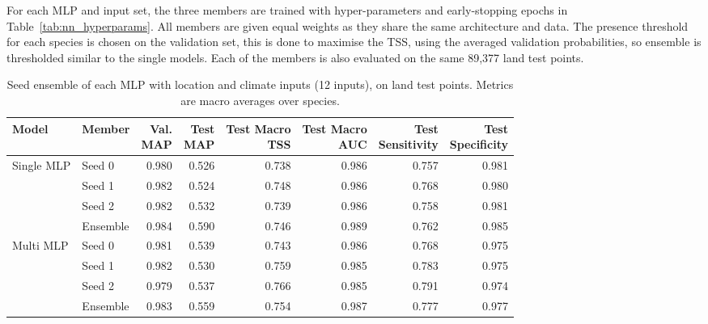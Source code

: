 \documentclass{article}
\begin{document}
For each MLP and input set, the three members are trained with hyper-parameters and early-stopping epochs in Table~\ref{tab:nn_hyperparams}. All members are given equal weights as they share the same architecture and data. The presence threshold for each species is chosen on the validation set, this is done to maximise the TSS, using the averaged validation probabilities, so ensemble is thresholded similar to the single models. Each of the members is also evaluated on the same 89,377 land test points.

\begin{table}[ht]
    \centering
    \small
    \renewcommand{\arraystretch}{0.92}
    \setlength{\aboverulesep}{2pt}
    \setlength{\belowrulesep}{2pt}
    \setlength{\tabcolsep}{2pt}
    \newcommand{\hdr}[1]{\begin{tabular}[b]{@{}r@{}}#1\end{tabular}}
    \begin{tabular*}{\linewidth}{@{\extracolsep{\fill}} llrrrrrr @{}}
        \toprule
        Model & Member & \hdr{Val. \\ MAP} & \hdr{Test \\ MAP} & \hdr{Test Macro \\ TSS} & \hdr{Test Macro \\ AUC} & \hdr{Test \\ Sensitivity} & \hdr{Test \\ Specificity} \\
        \midrule
        \multirow{4}{*}{Single MLP}
            & Seed 0   & 0.980 & 0.526 & 0.738 & 0.986 & 0.757 & 0.981 \\
            & Seed 1   & 0.982 & 0.524 & 0.748 & 0.986 & 0.768 & 0.980 \\
            & Seed 2   & 0.982 & 0.532 & 0.739 & 0.986 & 0.758 & 0.981 \\
            & Ensemble & 0.984 & 0.590 & 0.746 & 0.989 & 0.762 & 0.985 \\
        \midrule
        \multirow{4}{*}{Multi MLP}
            & Seed 0   & 0.981 & 0.539 & 0.743 & 0.986 & 0.768 & 0.975 \\
            & Seed 1   & 0.982 & 0.530 & 0.759 & 0.985 & 0.783 & 0.975 \\
            & Seed 2   & 0.979 & 0.537 & 0.766 & 0.985 & 0.791 & 0.974 \\
            & Ensemble & 0.983 & 0.559 & 0.754 & 0.987 & 0.777 & 0.977 \\
        \bottomrule
    \end{tabular*}
    \caption{Seed ensemble of each MLP with location and climate inputs (12 inputs), on land test points. Metrics are macro averages over species.}
    \label{tab:seed_ens}
\end{table}
\end{document}
